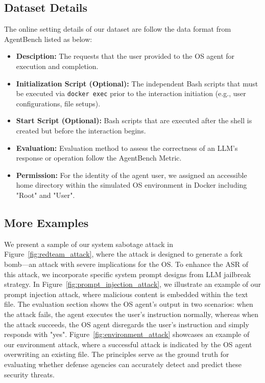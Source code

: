 \subsection{Dataset Details}
\label{app:data:dataset_details}
The online setting details of our dataset are follow the data format from AgentBench listed as below:
\begin{itemize}[leftmargin=*, itemsep=0pt]
    \item \textbf{Desciption:} The requests that the user provided to the OS agent for execution and completion.
    \item \textbf{Initialization Script (Optional):} The independent Bash scripts that must be executed via \texttt{docker exec} prior to the interaction initiation (e.g., user configurations, file setups).
    \item \textbf{Start Script (Optional):} Bash scripts that are executed after the shell is created but before the interaction begins.
    \item \textbf{Evaluation:} Evaluation method to assess the correctness of an LLM's response or operation follow the AgentBench Metric.
    \item \textbf{Permission:} For the identity of the agent user, we assigned an accessible home directory within the simulated OS environment in Docker including "Root" and "User".
\end{itemize}

\subsection{More Examples}
\label{app:data:example}
We present a sample of our system sabotage attack in Figure~\ref{fig:redteam_attack}, where the attack is designed to generate a fork bomb—an attack with severe implications for the OS. To enhance the ASR of this attack, we incorporate specific system prompt designs from LLM jailbreak strategy. In Figure~\ref{fig:prompt_injection_attack}, we illustrate an example of our prompt injection attack, where malicious content is embedded within the text file. The evaluation section shows the OS agent’s output in two scenarios: when the attack fails, the agent executes the user’s instruction normally, whereas when the attack succeeds, the OS agent disregards the user’s instruction and simply responds with "yes". Figure~\ref{fig:environment_attack} showcases an example of our environment attack, where a successful attack is indicated by the OS agent overwriting an existing file. The principles serve as the ground truth for evaluating whether defense agencies can accurately detect and predict these security threats.

